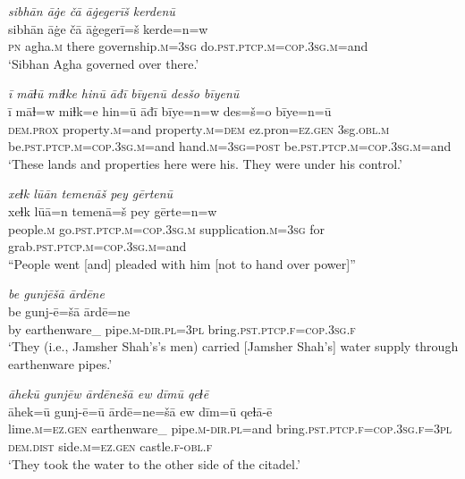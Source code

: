 \ea \label{DP.27}
\textit{sibhān āġe čā āġegerīš kerdenū} \\ 
\gll sibhān āġe čā āġegerī=š kerde=n=w \\ 
 \textsc{pn} agha\textsc{.m} there governship\textsc{.m}\textsc{=3sg} do\textsc{.pst}\textsc{.ptcp}\textsc{.m}\textsc{=cop}\textsc{.3sg}\textsc{.m}=and \\ 
\glt `Sibhan Agha governed over there.'
\z 
 
\ea \label{DP.28}
\textit{ī māɫū miɫke hinū āđī bīyenū desšo bīyenū} \\ 
\gll ī māɫ=w miɫk=e hin=ū āđī bīye=n=w des=š=o bīye=n=ū \\ 
 \textsc{dem.prox} property\textsc{.m}=and property\textsc{.m}\textsc{=dem} ez.pron\textsc{=ez}\textsc{.gen} 3sg\textsc{.obl}\textsc{.m} be\textsc{.pst}\textsc{.ptcp}\textsc{.m}\textsc{=cop}\textsc{.3sg}\textsc{.m}=and hand\textsc{.m}\textsc{=3sg}\textsc{=\textsc{post}} be\textsc{.pst}\textsc{.ptcp}\textsc{.m}\textsc{=cop}\textsc{.3sg}\textsc{.m}=and \\ 
\glt `These lands and properties here were his. They were under his control.'
\z 
 
\ea \label{DP.29}
\textit{xeɫk lūān temenāš pey gērtenū} \\ 
\gll xeɫk lūā=n temenā=š pey gērte=n=w \\ 
 people\textsc{.m} go\textsc{.pst}\textsc{.ptcp}\textsc{.m}\textsc{=cop}\textsc{.3sg}\textsc{.m} supplication\textsc{.m}\textsc{=3sg} for grab\textsc{.pst}\textsc{.ptcp}\textsc{.m}\textsc{=cop}\textsc{.3sg}\textsc{.m}=and \\ 
\glt ``People went [and] pleaded with him [not to hand over power]''
\z 
 
\ea \label{DP.31}
\textit{be gunjēšā ārdēne} \\ 
\gll be gunj-ē=šā ārdē=ne \\ 
 by earthenware\_ pipe\textsc{.m}\textsc{-dir}\textsc{.pl}\textsc{=3pl} bring\textsc{.pst}\textsc{.ptcp}\textsc{\textsc{.f}}\textsc{=cop}\textsc{.3sg}\textsc{\textsc{.f}} \\ 
\glt `They (i.e., Jamsher Shah’s’s men) carried [Jamsher Shah’s] water supply through earthenware pipes.'
\z 
 
\ea \label{DP.32}
\textit{āhekū gunjēw ārdēnešā ew dīmū qeɫē} \\ 
\gll āhek=ū gunj-ē=ū ārdē=ne=šā ew dīm=ū qeɫā-ē \\ 
 lime\textsc{.m}\textsc{=ez}\textsc{.gen} earthenware\_ pipe\textsc{.m}\textsc{-dir}\textsc{.pl}=and bring\textsc{.pst}\textsc{.ptcp}\textsc{\textsc{.f}}\textsc{=cop}\textsc{.3sg}\textsc{\textsc{.f}}\textsc{=3pl} \textsc{dem.dist} side\textsc{.m}\textsc{=ez}\textsc{.gen} castle\textsc{\textsc{.f}}\textsc{-obl}\textsc{\textsc{.f}} \\ 
\glt `They took the water to the other side of the citadel.'
\z 
 
